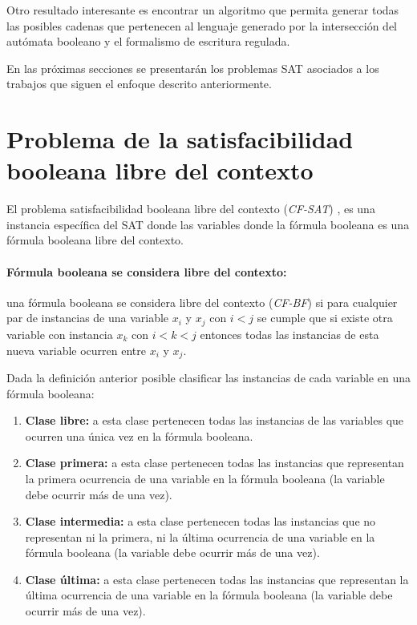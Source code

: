 \documentclass{article}
\begin{document}
Otro resultado interesante es encontrar un algoritmo que permita generar todas las posibles cadenas que pertenecen al lenguaje
generado por la intersección del autómata booleano y el formalismo de escritura regulada.

En las próximas secciones se presentarán los problemas SAT asociados a los trabajos que siguen el enfoque descrito anteriormente.

\section{Problema de la satisfacibilidad booleana libre del contexto}

El problema satisfacibilidad booleana libre del contexto (\textit{CF-SAT}) \cite{aCFSAT}, es una instancia específica
del SAT donde las variables donde la fórmula booleana es una fórmula booleana libre del contexto.

\paragraph{Fórmula booleana se considera libre del contexto:} una fórmula booleana se considera libre del contexto
(\textit{CF-BF}) si para cualquier par de instancias de una variable $x_i$ y $x_j$ con $i<j$ se
cumple que si existe otra variable con instancia $x_k$ con $i<k<j$ entonces todas las instancias de esta nueva
variable ocurren entre $x_i$ y $x_j$.

Dada la definición anterior posible clasificar las instancias de cada variable en una fórmula booleana:

\begin{enumerate}
      \item \textbf{Clase libre:} a esta clase pertenecen todas las instancias de las variables que ocurren
            una única vez en la fórmula booleana.
      \item \textbf{Clase primera:} a esta clase pertenecen todas las instancias que representan la primera
            ocurrencia de una variable en la fórmula booleana (la variable debe ocurrir más de una vez).
      \item \textbf{Clase intermedia:} a esta clase pertenecen todas las instancias que no representan ni la primera, ni la última
            ocurrencia de una variable en la fórmula booleana (la variable debe ocurrir más de una vez).
      \item \textbf{Clase última:} a esta clase pertenecen todas las instancias que representan la última
            ocurrencia de una variable en la fórmula booleana (la variable debe ocurrir más de una vez).
\end{enumerate}
\end{document}
